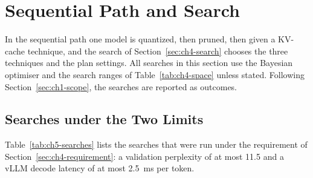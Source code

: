 \section{Sequential Path and Search}
\label{sec:ch5-search}

In the sequential path one model is quantized, then pruned, then given a KV-cache technique, and the search of Section~\ref{sec:ch4-search} chooses the three techniques and the plan settings. All searches in this section use the Bayesian optimiser and the search ranges of Table~\ref{tab:ch4-space} unless stated. Following Section~\ref{sec:ch1-scope}, the searches are reported as outcomes.

\subsection{Searches under the Two Limits}

Table~\ref{tab:ch5-searches} lists the searches that were run under the requirement of Section~\ref{sec:ch4-requirement}: a validation perplexity of at most 11.5 and a vLLM decode latency of at most 2.5~ms per token.

